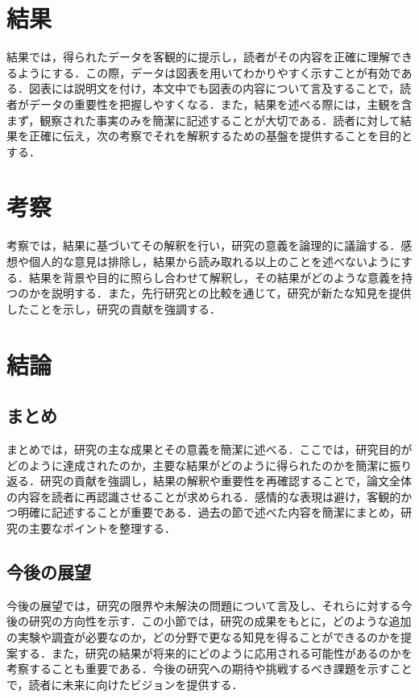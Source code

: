 \documentclass[dvipdfmx]{jsarticle} %
\theoremstyle{definition} %
\begin{document}
\section{結果}
結果では，得られたデータを客観的に提示し，読者がその内容を正確に理解できるようにする．この際，データは図表を用いてわかりやすく示すことが有効である．図表には説明文を付け，本文中でも図表の内容について言及することで，読者がデータの重要性を把握しやすくなる．また，結果を述べる際には，主観を含まず，観察された事実のみを簡潔に記述することが大切である．読者に対して結果を正確に伝え，次の考察でそれを解釈するための基盤を提供することを目的とする．

\section{考察}
考察では，結果に基づいてその解釈を行い，研究の意義を論理的に議論する．感想や個人的な意見は排除し，結果から読み取れる以上のことを述べないようにする．結果を背景や目的に照らし合わせて解釈し，その結果がどのような意義を持つのかを説明する．また，先行研究との比較を通じて，研究が新たな知見を提供したことを示し，研究の貢献を強調する．

\section{結論}
\subsection{まとめ}
まとめでは，研究の主な成果とその意義を簡潔に述べる．ここでは，研究目的がどのように達成されたのか，主要な結果がどのように得られたのかを簡潔に振り返る．研究の貢献を強調し，結果の解釈や重要性を再確認することで，論文全体の内容を読者に再認識させることが求められる．感情的な表現は避け，客観的かつ明確に記述することが重要である．過去の節で述べた内容を簡潔にまとめ，研究の主要なポイントを整理する．

\subsection{今後の展望}
今後の展望では，研究の限界や未解決の問題について言及し、それらに対する今後の研究の方向性を示す．この小節では，研究の成果をもとに，どのような追加の実験や調査が必要なのか，どの分野で更なる知見を得ることができるのかを提案する．また，研究の結果が将来的にどのように応用される可能性があるのかを考察することも重要である．今後の研究への期待や挑戦するべき課題を示すことで，読者に未来に向けたビジョンを提供する．
\end{document}

